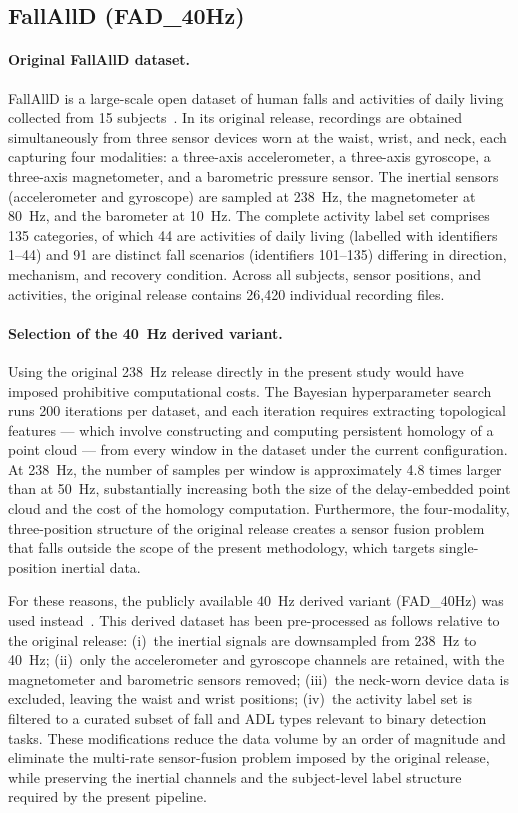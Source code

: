 \documentclass[onluarkali,ingilizce,yukseklisans,karton,LisansustuEgitim]{itutez}
\providecommand{\1}{\mathbf{1}}
\begin{document}
\subsection{FallAllD (FAD\_40Hz)}
\label{subsubsec:fallalld}

\paragraph{Original FallAllD dataset.}
FallAllD is a large-scale open dataset of human falls and activities of daily living collected from 15 subjects~\parencite{fallalld}. In its original release, recordings are obtained simultaneously from three sensor devices worn at the waist, wrist, and neck, each capturing four modalities: a three-axis accelerometer, a three-axis gyroscope, a three-axis magnetometer, and a barometric pressure sensor. The inertial sensors (accelerometer and gyroscope) are sampled at 238~Hz, the magnetometer at 80~Hz, and the barometer at 10~Hz. The complete activity label set comprises 135 categories, of which 44 are activities of daily living (labelled with identifiers 1--44) and 91 are distinct fall scenarios (identifiers 101--135) differing in direction, mechanism, and recovery condition. Across all subjects, sensor positions, and activities, the original release contains 26{,}420 individual recording files.

\paragraph{Selection of the 40~Hz derived variant.}
Using the original 238~Hz release directly in the present study would have imposed prohibitive computational costs. The Bayesian hyperparameter search runs 200 iterations per dataset, and each iteration requires extracting topological features --- which involve constructing and computing persistent homology of a point cloud --- from every window in the dataset under the current configuration. At 238~Hz, the number of samples per window is approximately 4.8 times larger than at 50~Hz, substantially increasing both the size of the delay-embedded point cloud and the cost of the homology computation. Furthermore, the four-modality, three-position structure of the original release creates a sensor fusion problem that falls outside the scope of the present methodology, which targets single-position inertial data.

For these reasons, the publicly available 40~Hz derived variant (FAD\_40Hz) was used instead~\parencite{fallalld}. This derived dataset has been pre-processed as follows relative to the original release: (i)~the inertial signals are downsampled from 238~Hz to 40~Hz; (ii)~only the accelerometer and gyroscope channels are retained, with the magnetometer and barometric sensors removed; (iii)~the neck-worn device data is excluded, leaving the waist and wrist positions; (iv)~the activity label set is filtered to a curated subset of fall and ADL types relevant to binary detection tasks. These modifications reduce the data volume by an order of magnitude and eliminate the multi-rate sensor-fusion problem imposed by the original release, while preserving the inertial channels and the subject-level label structure required by the present pipeline.
\end{document}
